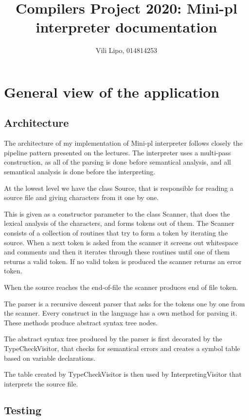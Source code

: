 \documentclass[12pt,a4paper]{article}
\author{Vili Lipo, 014814253}
\title{Compilers Project 2020: Mini-pl interpreter documentation}
\begin{document}
\maketitle
\newpage

\section{General view of the application}
\subsection{Architecture}

The architecture of my implementation of Mini-pl interpreter
follows closely the pipeline pattern presented on the lectures.
The interpreter uses a multi-pass construction, as all of the
parsing is done before semantical analysis, and all semantical
analysis is done before the interpreting.

At the lowest level we have the class Source, that is responsible
for reading a source file and giving characters from it one by one.

This is given as a constructor parameter to the class Scanner, that
does the lexical analysis of the characters, and forms tokens out
of them. The Scanner consists of a collection of routines that
try to form a token by iterating the source. When a next
token is asked from the scanner it screens out whitespace and
comments and then it iterates through these
routines until one of them returns a valid token. If no
valid token is produced the scanner returns an error token.

When the source reaches the end-of-file the scanner produces
end of file token.

The parser is a recursive descent parser that asks for the tokens
one by one from the scanner. Every construct in the language has
a own method for parsing it. These methods produce abstract syntax 
tree nodes.

The abstract syntax tree produced by the parser
is first decorated by the TypeCheckVisitor, that
checks for semantical errors and creates a symbol table
based on variable declarations.

The table created by TypeCheckVisitor is then used by
InterpretingVisitor that interprets the source file.



\subsection{Testing}
\end{document}
